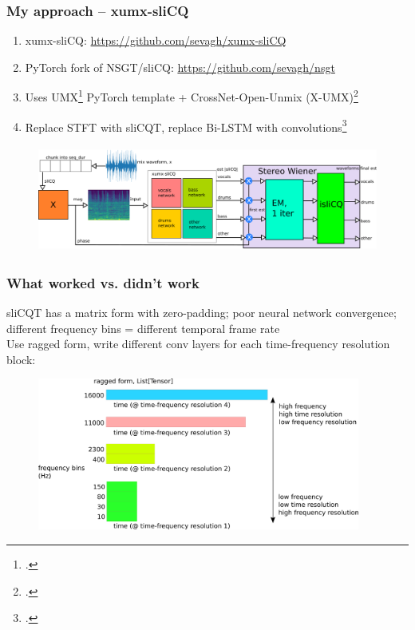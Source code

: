\documentclass[usenames,dvipsnames]{beamer}
\begin{document}
\begin{frame}
	\frametitle{My approach -- xumx-sliCQ}
	\begin{enumerate}
	\item
		xumx-sliCQ: \url{https://github.com/sevagh/xumx-sliCQ}
	\item
		PyTorch fork of NSGT/sliCQ: \url{https://github.com/sevagh/nsgt}
	\item
		Uses UMX\footcite{umx} PyTorch template + CrossNet-Open-Unmix (X-UMX)\footcite{xumx}
	\item
		Replace STFT with sliCQT, replace Bi-LSTM with convolutions\footcite{plumbley2}
\end{enumerate}
	\begin{figure}[ht]
		\centering
		\includegraphics[height=3.5cm]{./images-blockdiagrams/xumx_slicq_system_compressed.png}
		\vspace{-1em}
	\end{figure}
\end{frame}

\begin{frame}
	\frametitle{What worked vs. didn't work}
	sliCQT has a matrix form with zero-padding; poor neural network convergence; different frequency bins = different temporal frame rate\\
	Use ragged form, write different conv layers for each time-frequency resolution block:
	\begin{figure}[ht]
		\centering
		\includegraphics[height=5cm]{./images-blockdiagrams/slicq_shape.png}
	\end{figure}
\end{frame}
\end{document}
